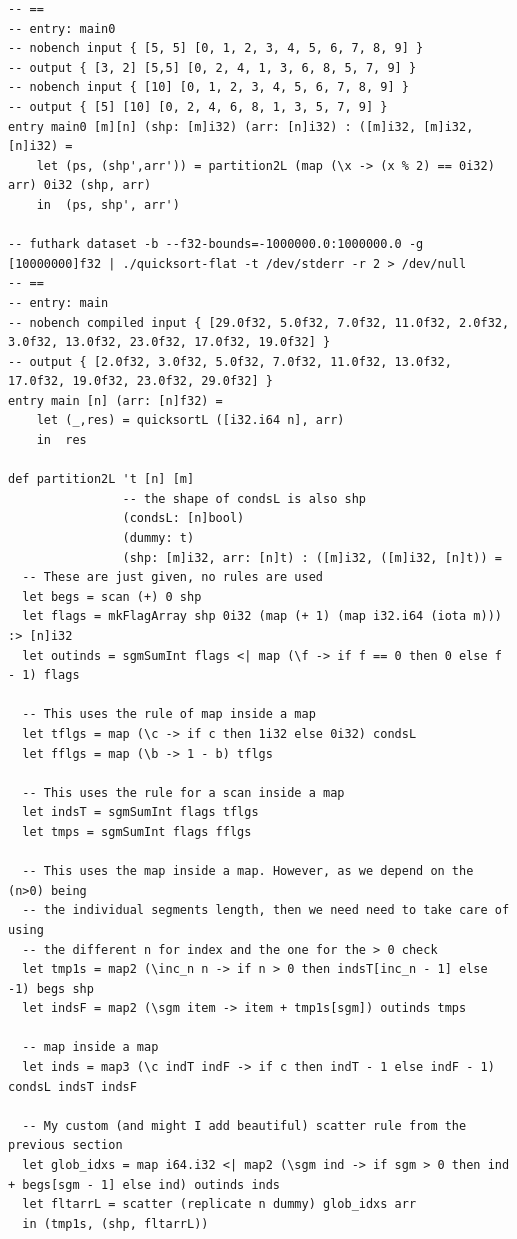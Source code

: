 \begin{lstlisting}[language={futhark}]
-- ==
-- entry: main0
-- nobench input { [5, 5] [0, 1, 2, 3, 4, 5, 6, 7, 8, 9] }
-- output { [3, 2] [5,5] [0, 2, 4, 1, 3, 6, 8, 5, 7, 9] }
-- nobench input { [10] [0, 1, 2, 3, 4, 5, 6, 7, 8, 9] }
-- output { [5] [10] [0, 2, 4, 6, 8, 1, 3, 5, 7, 9] }
entry main0 [m][n] (shp: [m]i32) (arr: [n]i32) : ([m]i32, [m]i32, [n]i32) =
    let (ps, (shp',arr')) = partition2L (map (\x -> (x % 2) == 0i32) arr) 0i32 (shp, arr)
    in  (ps, shp', arr')

-- futhark dataset -b --f32-bounds=-1000000.0:1000000.0 -g [10000000]f32 | ./quicksort-flat -t /dev/stderr -r 2 > /dev/null
-- ==
-- entry: main
-- nobench compiled input { [29.0f32, 5.0f32, 7.0f32, 11.0f32, 2.0f32, 3.0f32, 13.0f32, 23.0f32, 17.0f32, 19.0f32] }
-- output { [2.0f32, 3.0f32, 5.0f32, 7.0f32, 11.0f32, 13.0f32, 17.0f32, 19.0f32, 23.0f32, 29.0f32] }
entry main [n] (arr: [n]f32) =
    let (_,res) = quicksortL ([i32.i64 n], arr)
    in  res

def partition2L 't [n] [m]
                -- the shape of condsL is also shp
                (condsL: [n]bool)
                (dummy: t)
                (shp: [m]i32, arr: [n]t) : ([m]i32, ([m]i32, [n]t)) =
  -- These are just given, no rules are used
  let begs = scan (+) 0 shp
  let flags = mkFlagArray shp 0i32 (map (+ 1) (map i32.i64 (iota m))) :> [n]i32
  let outinds = sgmSumInt flags <| map (\f -> if f == 0 then 0 else f - 1) flags

  -- This uses the rule of map inside a map
  let tflgs = map (\c -> if c then 1i32 else 0i32) condsL
  let fflgs = map (\b -> 1 - b) tflgs

  -- This uses the rule for a scan inside a map
  let indsT = sgmSumInt flags tflgs
  let tmps = sgmSumInt flags fflgs

  -- This uses the map inside a map. However, as we depend on the (n>0) being
  -- the individual segments length, then we need need to take care of using
  -- the different n for index and the one for the > 0 check
  let tmp1s = map2 (\inc_n n -> if n > 0 then indsT[inc_n - 1] else -1) begs shp
  let indsF = map2 (\sgm item -> item + tmp1s[sgm]) outinds tmps

  -- map inside a map
  let inds = map3 (\c indT indF -> if c then indT - 1 else indF - 1) condsL indsT indsF

  -- My custom (and might I add beautiful) scatter rule from the previous section
  let glob_idxs = map i64.i32 <| map2 (\sgm ind -> if sgm > 0 then ind + begs[sgm - 1] else ind) outinds inds
  let fltarrL = scatter (replicate n dummy) glob_idxs arr
  in (tmp1s, (shp, fltarrL))
\end{lstlisting}

